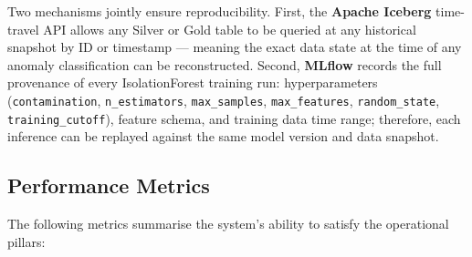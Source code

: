   Two mechanisms jointly ensure reproducibility. First, the                                                                                               
  \textbf{Apache Iceberg} time-travel API allows any Silver or
  Gold table to be queried at any historical snapshot by ID                                                                                               
  or timestamp — meaning the exact data state at the time of
  any anomaly classification can be reconstructed. Second,                                                                                                
  \textbf{MLflow} records the full provenance of every
  IsolationForest training run: hyperparameters
  (\texttt{contamination}, \texttt{n\_estimators},
  \texttt{max\_samples}, \texttt{max\_features},
  \texttt{random\_state}, \texttt{training\_cutoff}),
  feature schema, and training data time
  range; therefore, each inference can be replayed against the same
  model version and data snapshot.                                                                                                                                          
                                                                                                                                                          
\subsection{Performance Metrics}
  \label{subsec:performance_metrics}
                
  The following metrics summarise the system's ability to satisfy the operational pillars:
            
